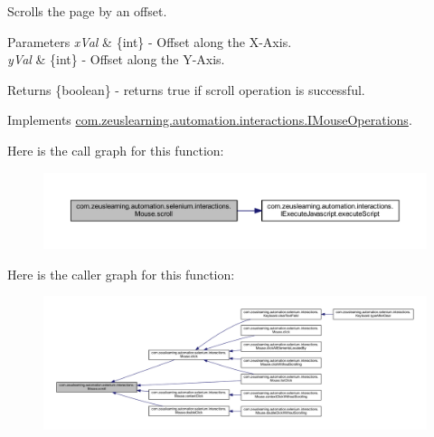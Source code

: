 Scrolls the page by an offset.


\begin{DoxyParams}{Parameters}
{\em x\+Val} & \{int\} -\/ Offset along the X-\/\+Axis. \\
\hline
{\em y\+Val} & \{int\} -\/ Offset along the Y-\/\+Axis.\\
\hline
\end{DoxyParams}
\begin{DoxyReturn}{Returns}
\{boolean\} -\/ returns {\ttfamily true} if scroll operation is successful. 
\end{DoxyReturn}


Implements \hyperlink{interfacecom_1_1zeuslearning_1_1automation_1_1interactions_1_1IMouseOperations_a44c25625c78ee054e4aa26452183959a}{com.\+zeuslearning.\+automation.\+interactions.\+I\+Mouse\+Operations}.

Here is the call graph for this function\+:
\nopagebreak
\begin{figure}[H]
\begin{center}
\leavevmode
\includegraphics[width=350pt]{d0/dfa/classcom_1_1zeuslearning_1_1automation_1_1selenium_1_1interactions_1_1Mouse_a6ff0b8676b191327548fc56b852c2a65_cgraph}
\end{center}
\end{figure}
Here is the caller graph for this function\+:
\nopagebreak
\begin{figure}[H]
\begin{center}
\leavevmode
\includegraphics[width=350pt]{d0/dfa/classcom_1_1zeuslearning_1_1automation_1_1selenium_1_1interactions_1_1Mouse_a6ff0b8676b191327548fc56b852c2a65_icgraph}
\end{center}
\end{figure}
\hypertarget{classcom_1_1zeuslearning_1_1automation_1_1selenium_1_1interactions_1_1Mouse_a64c168b0d5f3a2df84426d3723960a97}{}\label{classcom_1_1zeuslearning_1_1automation_1_1selenium_1_1interactions_1_1Mouse_a64c168b0d5f3a2df84426d3723960a97} 
